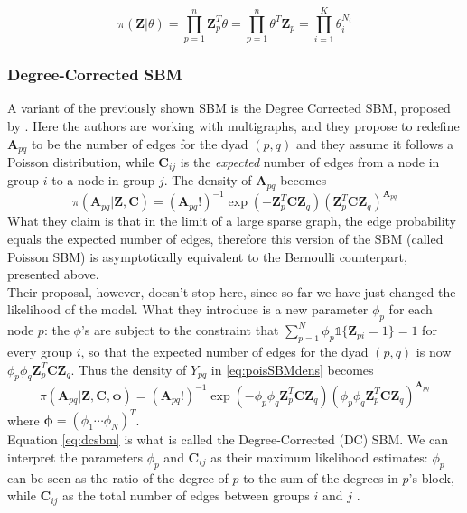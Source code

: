 \begin{equation}
    \pi(\mathbf{Z}|\theta) = \prod_{p=1}^n \mathbf{Z}_p^T \theta = \prod_{p=1}^n \theta^T \mathbf{Z}_p = \prod_{i=1}^K \theta^{N_i}_i
\end{equation}

\subsubsection{Degree-Corrected SBM}
A variant of the previously shown SBM is the Degree Corrected SBM, proposed by \textcite{karrer2011dcsbm}. Here the authors are working with multigraphs, and they propose to redefine $\mathbf{A}_{pq}$ to be the number of edges for the dyad $(p,q)$ and they assume it follows a Poisson distribution, while $\mathbf{C}_{ij}$ is the \textit{expected} number of edges from a node in group $i$ to a node in group $j$. The density of $\mathbf{A}_{pq}$ becomes
\begin{equation}\label{eq:poisSBMdens}
    \pi(\mathbf{A}_{pq}|\mathbf{Z,C}) = (\mathbf{A}_{pq}!)^{-1} \exp \left( -\mathbf{Z}^T_p \mathbf{C} \mathbf{Z}_q \right) \left( \mathbf{Z}^T_p \mathbf{C} \mathbf{Z}_q \right)^{\mathbf{A}_{pq}}
\end{equation}
What they claim is that in the limit of a large sparse graph, the edge probability equals the expected number of edges, therefore this version of the SBM (called Poisson SBM) is asymptotically equivalent to the Bernoulli counterpart, presented above.\\
Their proposal, however, doesn't stop here, since so far we have just changed the likelihood of the model. What they introduce is a new parameter $\phi_p$ for each node $p$: the $\phi$'s are subject to the constraint that $\sum_{p=1}^N \phi_p \mathbb{1}\{\mathbf{Z}_{pi} = 1\} = 1$ for every group $i$, so that the expected number of edges for the dyad $(p,q)$ is now $\phi_p \phi_q \mathbf{Z}^T_p \mathbf{C} \mathbf{Z}_q$. Thus the density of $Y_{pq}$ in \ref{eq:poisSBMdens} becomes
\begin{equation}\label{eq:dcsbm}
    \pi(\mathbf{A}_{pq}|\mathbf{Z,C,\phi}) = (\mathbf{A}_{pq}!)^{-1} \exp \left( -\phi_p \phi_q \mathbf{Z}^T_p \mathbf{C} \mathbf{Z}_q \right) \left(\phi_p \phi_q \mathbf{Z}^T_p \mathbf{C} \mathbf{Z}_q \right)^{\mathbf{A}_{pq}}
\end{equation}
where $\mathbf{\phi} = (\phi_1 \cdots \phi_N)^T$.\\
Equation \ref{eq:dcsbm} is what is called the Degree-Corrected (DC) SBM. We can interpret the parameters $\phi_p$ and $\mathbf{C}_{ij}$ as their maximum likelihood estimates: $\phi_p$ can be seen as the ratio of the degree of $p$ to the sum of the degrees in $p$'s block, while $\mathbf{C}_{ij}$ as the total number of edges between groups $i$ and $j$ \cite{lee2019review}.
